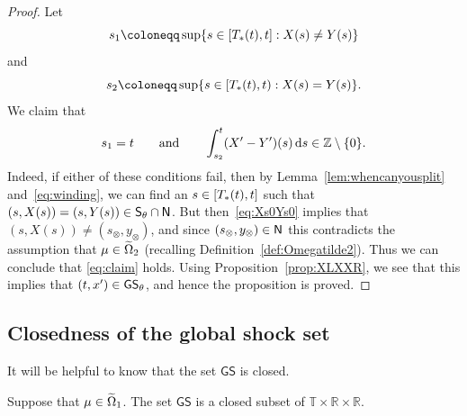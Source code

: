 \documentclass[AHL,Unicode,longabstracts]{cedram}
\newcommand*\ssS{\mathsf{S}}
\newcommand*\GS{\mathsf{GS}}
\newcommand*\ssN{\mathsf{N}}
\newcommand*\TT{\mathbb{T}}
\newcommand*\RR{\mathbb{R}}
\newcommand*\ZZ{\mathbb{Z}}
\newcommand*\st{\mathrel{:}}
\newcommand*\dif{\mathrm{d}}
\let\oldin\in
\renewcommand{\in}{\mathchoice{\oldin}{\oldin}{\,\oldin\,}{\,\oldin\,}}
\let\oldcap\cap
\renewcommand{\cap}{\mathchoice{\oldcap}{\oldcap}{\,\oldcap\,}{\,\oldcap\,}}
\newcommand*\TT{\mathbb{T}}
\newcommand*\RR{\mathbb{R}}
\newcommand*\ZZ{\mathbb{Z}}
\begin{document}
\begin{proof}
Let
\[
s_{1}\coloneqq\sup\{s\in[T_{*}(t),t]\st X(s)\ne Y(s)\}
\]
and
\[
s_{2}\coloneqq\sup\{s\in[T_{*}(t),t)\st X(s)=Y(s)\}.
\]
We claim that
\begin{equation}\label{eq:claim}
s_{1}=t\qquad\text{and}\qquad\int_{s_{2}}^{t}(X'-Y')(s)\,\dif s\in\ZZ\setminus\{0\}.
\end{equation}
Indeed, if either of these conditions fail, then by Lemma~\ref{lem:whencanyousplit} and~\eqref{eq:winding}, we can find an $s\in[T_{*}(t),t]$ such that $(s,X(s))=(s,Y(s))\in\ssS_{\theta}\cap\ssN$. But then~\eqref{eq:Xs0Ys0} implies that $(s,X(s))\ne(s_{\otimes},y_{\otimes})$, and since $(s_{\otimes},y_{\otimes})\in\ssN$ this contradicts the assumption that $\mu\in\widetilde{\Omega}_{2}$ (recalling Definition~\ref{def:Omegatilde2}). Thus we can conclude that \eqref{eq:claim} holds. Using Proposition~\ref{prop:XLXXR}, we see that this implies that $(t,x')\in\GS_{\theta}$, and hence the proposition is proved.
\end{proof}

\subsection{Closedness of the global shock set}

It will be helpful to know that the set $\GS$ is closed.

\begin{prop}\label{prop:GSclosed}
Suppose that $\mu\in\widetilde{\Omega}_{1}$. The set $\GS$ is a closed subset of $\TT\times\RR\times\RR$.
\end{prop}
\end{document}
